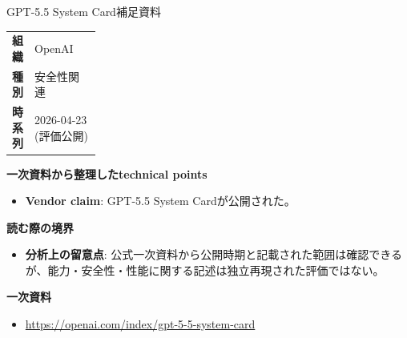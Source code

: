 \begin{technicalnote}{GPT-5.5 System Card}{補足資料}
\begingroup
\begin{tabularx}{\linewidth}{@{}>{\bfseries}p{0.22\linewidth}X@{}}
組織 & OpenAI \\
種別 & 安全性関連 \\
時系列 & 2026-04-23 (評価公開) \\
\end{tabularx}
\smallskip
{\bfseries 一次資料から整理したtechnical points}
\begin{itemize}[leftmargin=1.5em,itemsep=0.35em]
\item \textbf{Vendor claim}: GPT-5.5 System Cardが公開された。
\end{itemize}
\begin{minipage}{\linewidth}
{\bfseries 読む際の境界}
\begin{itemize}[leftmargin=1.5em,itemsep=0.35em]
\item \textbf{分析上の留意点}: 公式一次資料から公開時期と記載された範囲は確認できるが、能力・安全性・性能に関する記述は独立再現された評価ではない。
\end{itemize}
\begin{samepage}
{\bfseries 一次資料}
\begingroup\sloppy
\begin{itemize}[leftmargin=1.5em,itemsep=0.25em]
\item {\scriptsize\url{https://openai.com/index/gpt-5-5-system-card}}
\end{itemize}
\endgroup
\end{samepage}
\end{minipage}
\endgroup
\end{technicalnote}
\medskip

